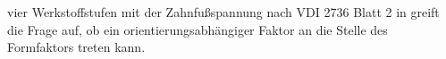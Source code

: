 vier Werkstoffstufen mit der Zahnfußspannung nach VDI 2736 Blatt 2 in  greift die Frage auf, ob ein orientierungsabhängiger Faktor an die Stelle des Formfaktors treten kann.


